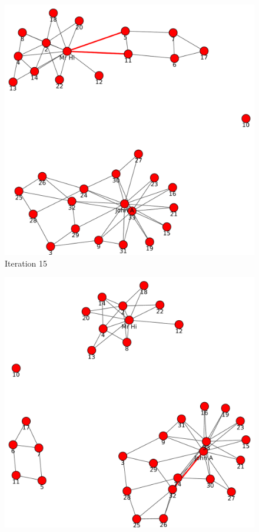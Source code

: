 \begin{itemize}
\begin{figure}[h!]
\begin{center}
\includegraphics[scale=0.55, keepaspectratio=true]{figures/graphs/EdgeHighlightedGraph15.pdf}
\caption{Iteration 15}
\label{fig:q2fig5}
\end{center}
\end{figure}
\newpage
\begin{figure}[h!]
\begin{center}
\includegraphics[scale=0.55, keepaspectratio=true]{figures/graphs/EdgeHighlightedGraph16.pdf}

\end{center}
\end{figure}
\end{itemize}

